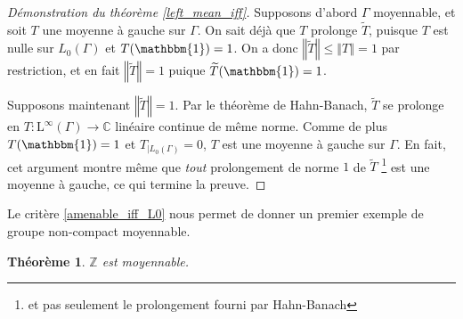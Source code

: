 \documentclass[a4paper,12pt]{article}
\newtheorem{theorem}{Théorème}[section]
\newcommand{\Z}{\mathbb{Z}}
\newcommand{\C}{\mathbb{C}}
\newcommand{\norm}[1]{\left\Vert #1\right\Vert}
\newcommand{\indic}{\mathbbm{1}}
\begin{document}
\begin{proof}[Démonstration du théorème \ref{left_mean_iff}]
    Supposons d'abord $\Gamma$ moyennable, et soit $T$ une moyenne à gauche sur $\Gamma$.
    On sait déjà que $T$ prolonge $\widetilde{T}$, puisque $T$ est nulle sur $L_0(\Gamma)$ et 
    $T(\indic)=1$. On a donc $\norm{\widetilde{T}}\le\norm{T}=1$ par restriction, et en fait $\norm{\widetilde{T}} = 1$
    puique $\widetilde{T}(\indic)=1$. 

    Supposons maintenant $\norm{\widetilde{T}}=1$. Par le théorème de Hahn-Banach, $\widetilde{T}$ se prolonge 
    en $T:\mathrm{L}^\infty(\Gamma)\to\C$ linéaire continue de même norme. Comme de plus $T(\indic)=1$ et 
    $T_{|L_0(\Gamma)} = 0$, $T$ est une moyenne à gauche sur $\Gamma$. En fait, cet argument montre même 
    que \emph{tout} prolongement de norme $1$ de $\widetilde{T}$ \footnote{et pas seulement le prolongement fourni par Hahn-Banach} 
    est une moyenne à gauche, ce qui termine la preuve.
\end{proof}

Le critère \ref{amenable_iff_L0} nous permet de donner un premier exemple de groupe non-compact moyennable.

\begin{theorem}\label{Z_amenable}
    $\Z$ est moyennable.
\end{theorem}
\end{document}
